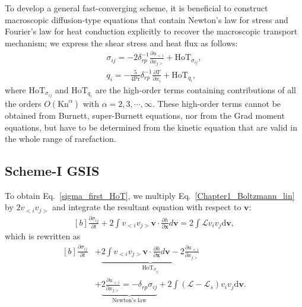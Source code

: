 To develop a general fast-converging scheme, it is beneficial to construct macroscopic diffusion-type equations that contain Newton's law for stress and Fourier's law for heat conduction explicitly to recover the macroscopic transport mechanism; we express the shear stress and heat flux as follows:
\begin{eqnarray}
\sigma_{ij} =-2\delta_{rp}^{-1}\frac{\partial u_{<i}}{\partial {x_{j>}}}+\text{HoT}_{\sigma_{ij}}, \label{sigma_first_HoT}\\
q_i =-\frac{5}{4\mathrm{Pr}}\delta_{rp}^{-1} \frac{\partial T}{\partial x_i}+\text{HoT}_{q_i}, \label{q_first_HoT}
\end{eqnarray}
where $\text{HoT}_{\sigma_{ij}}$ and $\text{HoT}_{q_i}$ are the high-order terms containing contributions of all the orders $O(\text{Kn}^\alpha)$ with $\alpha=2,3,\cdots,\infty$.
These high-order terms cannot be obtained from Burnett, super-Burnett equations, nor from the Grad moment equations, but have to be determined from the kinetic equation that are valid in the whole range of rarefaction.  


\subsection{Scheme-I GSIS}

To obtain Eq.~\eqref{sigma_first_HoT}, we multiply Eq.~\eqref{Chapter1_Boltzmann_lin} by $2v_{<i}v_{j>}$ and integrate the resultant equation with respect to $\bm{v}$:
\begin{equation}\label{HoT_sigma0}
\begin{aligned}[b]
\frac{\partial \sigma_{ij}}{\partial {t}}
+2\int{v_{<i}v_{j>}} \bm{v}\cdot\frac{\partial h}{\partial \bm{x}}d\bm{v} =2\int{\mathcal{L}v_iv_j}\mathrm{d}\bm{v},
\end{aligned}
\end{equation}
which is rewritten as
\begin{equation}\label{HoT_sigma}
\begin{aligned}[b]
\frac{\partial \sigma_{ij}}{\partial {t}}
&+\underbrace{2\int{v_{<i}v_{j>}} \bm{v}\cdot\frac{\partial h}{\partial \bm{x}}d\bm{v}-2\frac{\partial{u_{<i}}}{\partial {x_{j>}}}}_{\text{HoT}_{\sigma_{ij}}}\\
&+\underbrace{2\frac{\partial{u_{<i}}}{\partial {x_{j>}}}=-\delta_{rp}\sigma_{ij}}_{\text{Newton's law}}+2\int{(\mathcal{L}-\mathcal{L}_s)v_iv_j}\mathrm{d}\bm{v}.
\end{aligned}
\end{equation}

